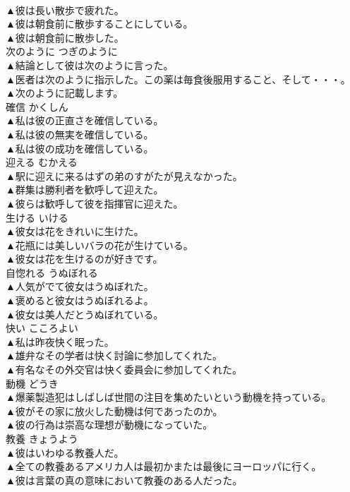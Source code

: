 \documentclass[8pt]{extreport}
\begin{document}
\begin{CJK}{UTF8}{min}
\\	▲彼は長い散歩で疲れた。 
\\	▲彼は朝食前に散歩することにしている。 
\\	▲彼は朝食前に散歩した。 
\\	次のように	つぎのように	
\\	▲結論として彼は次のように言った。 
\\	▲医者は次のように指示した。この薬は毎食後服用すること、そして・・・。 
\\	▲次のように記載します。 
\\	確信	かくしん	
\\	▲私は彼の正直さを確信している。 
\\	▲私は彼の無実を確信している。 
\\	▲私は彼の成功を確信している。 
\\	迎える	むかえる	
\\	▲駅に迎えに来るはずの弟のすがたが見えなかった。 
\\	▲群集は勝利者を歓呼して迎えた。 
\\	▲彼らは歓呼して彼を指揮官に迎えた。 
\\	生ける	いける	
\\	▲彼女は花をきれいに生けた。 
\\	▲花瓶には美しいバラの花が生けている。 
\\	▲彼女は花を生けるのが好きです。 
\\	自惚れる	うぬぼれる	
\\	▲人気がでて彼女はうぬぼれた。 
\\	▲褒めると彼女はうぬぼれるよ。 
\\	▲彼女は美人だとうぬぼれている。 
\\	快い	こころよい	
\\	▲私は昨夜快く眠った。 
\\	▲雄弁なその学者は快く討論に参加してくれた。 
\\	▲有名なその外交官は快く委員会に参加してくれた。 
\\	動機	どうき	
\\	▲爆薬製造犯はしばしば世間の注目を集めたいという動機を持っている。 
\\	▲彼がその家に放火した動機は何であったのか。 
\\	▲彼の行為は崇高な理想が動機になっていた。 
\\	教養	きょうよう	
\\	▲彼はいわゆる教養人だ。 
\\	▲全ての教養あるアメリカ人は最初かまたは最後にヨーロッパに行く。 
\\	▲彼は言葉の真の意味において教養のある人だった。 

\end{CJK}
\end{document}
